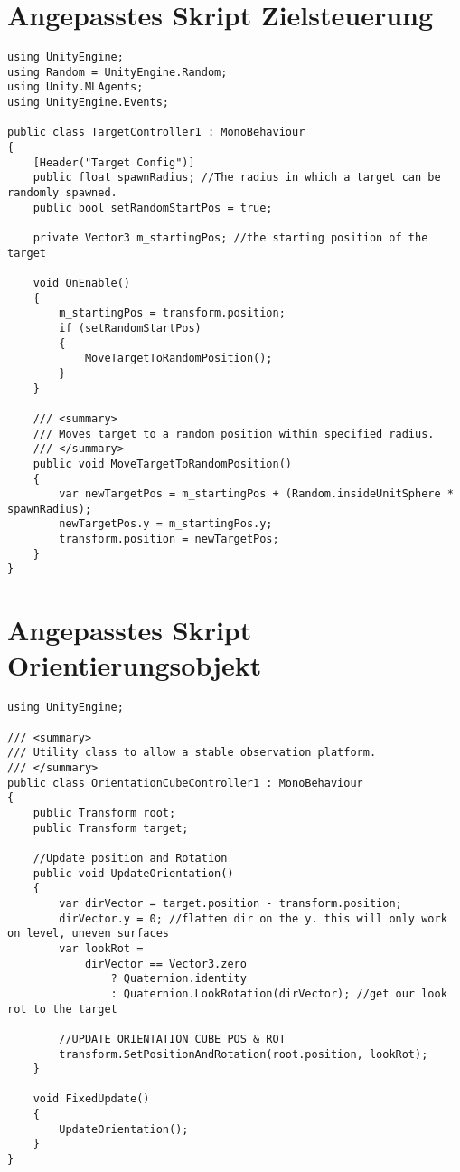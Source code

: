 \section{Angepasstes Skript Zielsteuerung}
\label{code:zielsteuerung}
\begin{lstlisting}[caption={Zielsteuerung Skript},captionpos=b,label={lst:skript_zielsteuerung}]
using UnityEngine;
using Random = UnityEngine.Random;
using Unity.MLAgents;
using UnityEngine.Events;

public class TargetController1 : MonoBehaviour
{
    [Header("Target Config")]
    public float spawnRadius; //The radius in which a target can be randomly spawned.
    public bool setRandomStartPos = true;

    private Vector3 m_startingPos; //the starting position of the target

    void OnEnable()
    {
        m_startingPos = transform.position;
        if (setRandomStartPos)
        {
            MoveTargetToRandomPosition();
        }
    }

    /// <summary>
    /// Moves target to a random position within specified radius.
    /// </summary>
    public void MoveTargetToRandomPosition()
    {
        var newTargetPos = m_startingPos + (Random.insideUnitSphere * spawnRadius);
        newTargetPos.y = m_startingPos.y;
        transform.position = newTargetPos;
    }
}
\end{lstlisting}

\newpage
\section{Angepasstes Skript Orientierungsobjekt}
\label{code:orientierungsobjekt}
\begin{lstlisting}[caption={Orientationsobjekt Skript},captionpos=b,label={lst:skript_orientationsobjekt}]
using UnityEngine;

/// <summary>
/// Utility class to allow a stable observation platform.
/// </summary>
public class OrientationCubeController1 : MonoBehaviour
{
    public Transform root;
    public Transform target;

    //Update position and Rotation
    public void UpdateOrientation()
    {
        var dirVector = target.position - transform.position;
        dirVector.y = 0; //flatten dir on the y. this will only work on level, uneven surfaces
        var lookRot =
            dirVector == Vector3.zero
                ? Quaternion.identity
                : Quaternion.LookRotation(dirVector); //get our look rot to the target

        //UPDATE ORIENTATION CUBE POS & ROT
        transform.SetPositionAndRotation(root.position, lookRot);
    }

    void FixedUpdate()
    {
        UpdateOrientation();
    }
}
\end{lstlisting}

